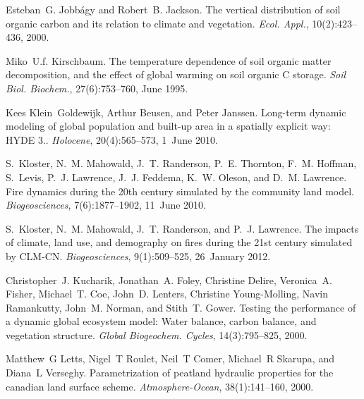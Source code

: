 \begin{DoxyDescription}
\item[\label{_CITEREF_Jobbagy2000-pa}%
\mbox{[}25\mbox{]}]Esteban~G. Jobbágy and Robert~B. Jackson. The vertical distribution of soil organic carbon and its relation to climate and vegetation. {\itshape Ecol. Appl.}, 10(2)\+:423--436, 2000. 


\item[\label{_CITEREF_Kirschbaum1995-db}%
\mbox{[}26\mbox{]}]Miko~U.\+f. Kirschbaum. The temperature dependence of soil organic matter decomposition, and the effect of global warming on soil organic C storage. {\itshape Soil Biol. Biochem.}, 27(6)\+:753--760, June 1995. 


\item[\label{_CITEREF_Klein_Goldewijk2010-lh}%
\mbox{[}27\mbox{]}]Kees Klein~Goldewijk, Arthur Beusen, and Peter Janssen. Long-\/term dynamic modeling of global population and built-\/up area in a spatially explicit way\+: H\+Y\+D\+E 3.. {\itshape Holocene}, 20(4)\+:565--573, 1~June 2010. 


\item[\label{_CITEREF_Kloster2010-633}%
\mbox{[}28\mbox{]}]S.~Kloster, N.~M. Mahowald, J.~T. Randerson, P.~E. Thornton, F.~M. Hoffman, S.~Levis, P.~J. Lawrence, J.~J. Feddema, K.~W. Oleson, and D.~M. Lawrence. Fire dynamics during the 20th century simulated by the community land model. {\itshape Biogeosciences}, 7(6)\+:1877--1902, 11~June 2010. 


\item[\label{_CITEREF_Kloster2012-c79}%
\mbox{[}29\mbox{]}]S.~Kloster, N.~M. Mahowald, J.~T. Randerson, and P.~J. Lawrence. The impacts of climate, land use, and demography on fires during the 21st century simulated by C\+L\+M-\/\+C\+N. {\itshape Biogeosciences}, 9(1)\+:509--525, 26~January 2012. 


\item[\label{_CITEREF_Kucharik2000-xk}%
\mbox{[}30\mbox{]}]Christopher~J. Kucharik, Jonathan~A. Foley, Christine Delire, Veronica~A. Fisher, Michael~T. Coe, John~D. Lenters, Christine Young-\/\+Molling, Navin Ramankutty, John~M. Norman, and Stith~T. Gower. Testing the performance of a dynamic global ecosystem model\+: Water balance, carbon balance, and vegetation structure. {\itshape Global Biogeochem. Cycles}, 14(3)\+:795--825, 2000. 


\item[\label{_CITEREF_Letts2000-pg}%
\mbox{[}31\mbox{]}]Matthew~G Letts, Nigel~T Roulet, Neil~T Comer, Michael~R Skarupa, and Diana~L Verseghy. Parametrization of peatland hydraulic properties for the canadian land surface scheme. {\itshape Atmosphere-\/\+Ocean}, 38(1)\+:141--160, 2000. 



\end{DoxyDescription}

